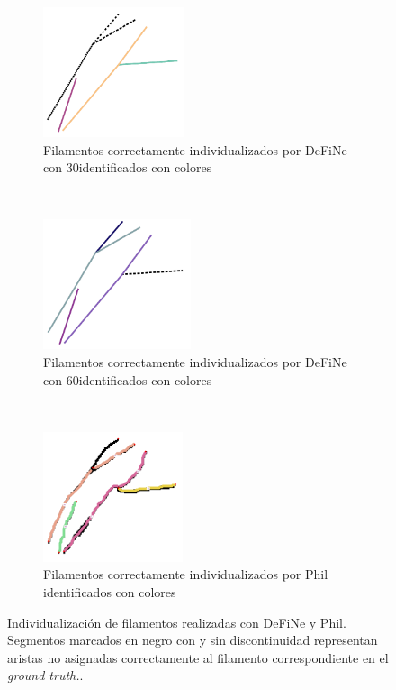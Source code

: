 \begin{figure}[h!]
    \begin{subfigure}[t]{0.3\textwidth}
        \centering
        \includegraphics[height=1.5in]{resultImages/field3-t0-2cellBcrop-filtered-2-DeFiNeExactMatch-30.png}
        \caption{Filamentos correctamente individualizados por DeFiNe con 30\textdegree identificados con colores}
        \label{fig:field3t0filtered2Results-d}
    \end{subfigure}%
    ~ 
    \begin{subfigure}[t]{0.3\textwidth}
        \centering
        \includegraphics[height=1.5in]{resultImages/field3-t0-2cellBcrop-filtered-2-DeFiNeExactMatch-60.png}
        \caption{Filamentos correctamente individualizados por DeFiNe con 60\textdegree identificados con colores}
        \label{fig:field3t0filtered2Results-e}
    \end{subfigure}
    ~ 
    \begin{subfigure}[t]{0.3\textwidth}
        \centering
        \includegraphics[height=1.5in]{resultImages/field3-t0-2cellBcrop-filtered-2-phil-s1271-v05-exactMatch-antLabeled.png}
        \caption{Filamentos correctamente individualizados por Phil identificados con colores}
        \label{fig:field3t0filtered2Results-f}
    \end{subfigure}
    
    \caption{Individualizaci\'on de filamentos realizadas con DeFiNe y Phil. Segmentos marcados en negro con y sin discontinuidad representan aristas no asignadas correctamente al filamento correspondiente en el {\it ground truth.}.}
    \label{fig:field3t0filtered2Results}
\end{figure}

